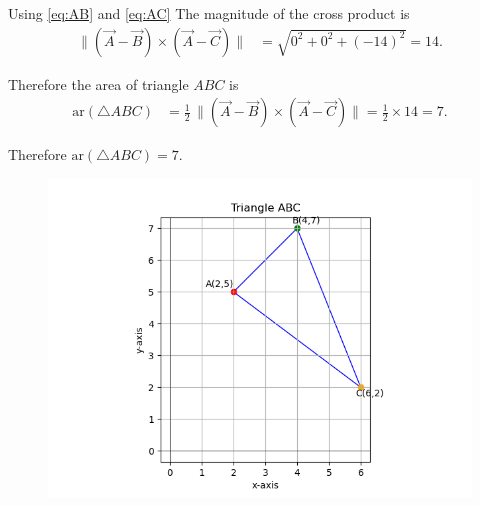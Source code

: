 \documentclass[journal]{IEEEtran}
\begin{document}
Using \eqref{eq:AB} and \eqref{eq:AC}  The magnitude of the cross product is
\begin{align}
\big\lVert (\vec{A}-\vec{B}) \times (\vec{A}-\vec{C}) \big\rVert
&= \sqrt{0^2 + 0^2 + (-14)^2} = 14.
\label{eq:norm}
\end{align}

Therefore the area of triangle \(ABC\) is
\begin{align}
\text{ar}(\triangle ABC)
&= \tfrac{1}{2}\,\big\lVert (\vec{A}-\vec{B}) \times (\vec{A}-\vec{C}) \big\rVert
= \tfrac{1}{2}\times 14 = 7.
\label{eq:area}
\end{align}

     Therefore  \(\displaystyle \text{ar}(\triangle ABC)=7\).
\begin{figure}[H]
\begin{center}
\includegraphics[width=0.6\columnwidth]{Figs/Fig1.png}
\end{center}
\caption{}
\label{fig:Fig.1}
\end{figure}
\end{document}
